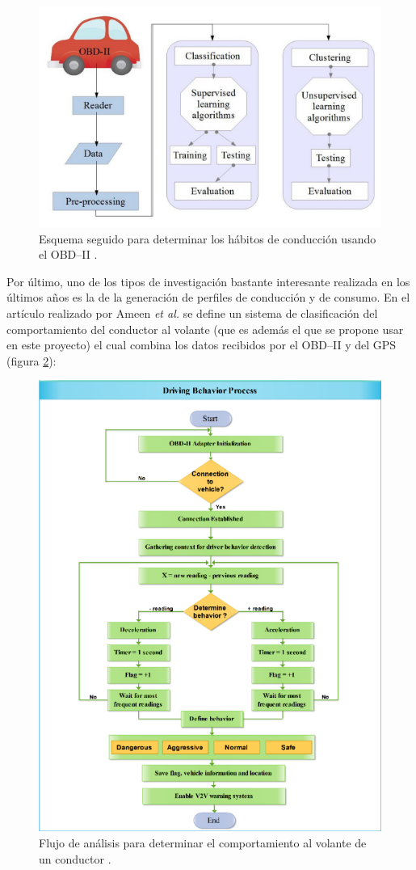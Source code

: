 \begin{figure}[H]
  \centering
  \includegraphics[width=.7\linewidth]{images/general-scheme-investigation.png}
  \caption{Esquema seguido para determinar los hábitos de conducción usando el \ac{OBD}--II \cite{hermawanAcquisitionModelingEvaluating2020}.}
  \label{fig:investigation-scheme}
\end{figure}

Por último, uno de los tipos de investigación bastante interesante realizada en los
últimos años es la de la generación de perfiles de conducción y de consumo. En el
artículo realizado por Ameen \textit{et al.} \cite{husseinaliameenDrivingBehaviourIdentification2021}
se define un sistema de clasificación del comportamiento del conductor al volante
(que es además el que se propone usar en este proyecto) el cual combina los datos
recibidos por el \ac{OBD}--II y del \ac{GPS} (figura \ref{fig:driving-behaviour}):

\begin{figure}[H]
  \centering
  \includegraphics[width=.7\linewidth]{images/driving-behaviour-workflow.png}
  \caption{Flujo de análisis para determinar el comportamiento al volante de un conductor \cite{husseinaliameenDrivingBehaviourIdentification2021}.}
  \label{fig:driving-behaviour}
\end{figure}

